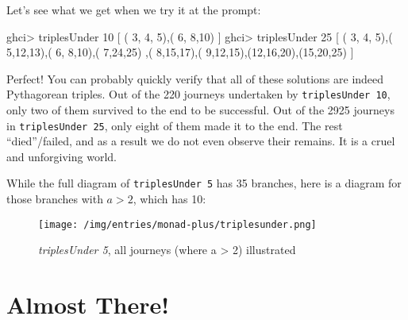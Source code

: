 \documentclass[]{article}
\newenvironment{Shaded}{}{}
\newcommand{\DecValTok}[1]{\textcolor[rgb]{0.25,0.63,0.44}{#1}}
\newcommand{\NormalTok}[1]{#1}
\newcommand{\OperatorTok}[1]{\textcolor[rgb]{0.40,0.40,0.40}{#1}}
\begin{document}
Let's see what we get when we try it at the prompt:

\begin{Shaded}
\begin{Highlighting}[]
\NormalTok{ghci}\OperatorTok{>}\NormalTok{ triplesUnder }\DecValTok{10}
\NormalTok{[ ( }\DecValTok{3}\NormalTok{, }\DecValTok{4}\NormalTok{, }\DecValTok{5}\NormalTok{),( }\DecValTok{6}\NormalTok{, }\DecValTok{8}\NormalTok{,}\DecValTok{10}\NormalTok{) ]}
\NormalTok{ghci}\OperatorTok{>}\NormalTok{ triplesUnder }\DecValTok{25}
\NormalTok{[ ( }\DecValTok{3}\NormalTok{, }\DecValTok{4}\NormalTok{, }\DecValTok{5}\NormalTok{),( }\DecValTok{5}\NormalTok{,}\DecValTok{12}\NormalTok{,}\DecValTok{13}\NormalTok{),( }\DecValTok{6}\NormalTok{, }\DecValTok{8}\NormalTok{,}\DecValTok{10}\NormalTok{),( }\DecValTok{7}\NormalTok{,}\DecValTok{24}\NormalTok{,}\DecValTok{25}\NormalTok{)}
\NormalTok{ ,( }\DecValTok{8}\NormalTok{,}\DecValTok{15}\NormalTok{,}\DecValTok{17}\NormalTok{),( }\DecValTok{9}\NormalTok{,}\DecValTok{12}\NormalTok{,}\DecValTok{15}\NormalTok{),(}\DecValTok{12}\NormalTok{,}\DecValTok{16}\NormalTok{,}\DecValTok{20}\NormalTok{),(}\DecValTok{15}\NormalTok{,}\DecValTok{20}\NormalTok{,}\DecValTok{25}\NormalTok{) ]}
\end{Highlighting}
\end{Shaded}

Perfect! You can probably quickly verify that all of these solutions are indeed
Pythagorean triples. Out of the 220 journeys undertaken by
\texttt{triplesUnder\ 10}, only two of them survived to the end to be
successful. Out of the 2925 journeys in \texttt{triplesUnder\ 25}, only eight of
them made it to the end. The rest ``died''/failed, and as a result we do not
even observe their remains. It is a cruel and unforgiving world.

While the full diagram of \texttt{triplesUnder\ 5} has 35 branches, here is a
diagram for those branches with \(a > 2\), which has 10:

\begin{figure}
\centering
\texttt{[image: /img/entries/monad-plus/triplesunder.png]}
\caption{\emph{triplesUnder 5}, all journeys (where a \textgreater{} 2)
illustrated}
\end{figure}

\hypertarget{almost-there}{%
\section{Almost There!}\label{almost-there}}
\end{document}
